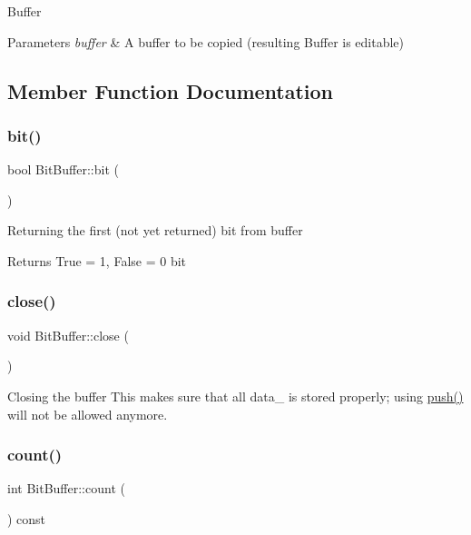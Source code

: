 Buffer 
\begin{DoxyParams}{Parameters}
{\em buffer} & A buffer to be copied (resulting Buffer is editable) \\
\hline
\end{DoxyParams}


\subsection{Member Function Documentation}
\mbox{\label{class_bit_buffer_a50d13861a778aff828e42e4f32371726}} 
\subsubsection{\texorpdfstring{bit()}{bit()}}
{\footnotesize\ttfamily bool Bit\+Buffer\+::bit (\begin{DoxyParamCaption}{ }\end{DoxyParamCaption})}

Returning the first (not yet returned) bit from buffer \begin{DoxyReturn}{Returns}
True = 1, False = 0 bit 
\end{DoxyReturn}
\mbox{\label{class_bit_buffer_a1075aee0daeee83dbe4908c325b6969f}} 
\subsubsection{\texorpdfstring{close()}{close()}}
{\footnotesize\ttfamily void Bit\+Buffer\+::close (\begin{DoxyParamCaption}{ }\end{DoxyParamCaption})}

Closing the buffer This makes sure that all data\+\_\+ is stored properly; using \hyperlink{class_bit_buffer_a1998d0bdd95e025f39e81671f5a20106}{push()} will not be allowed anymore. \mbox{\label{class_bit_buffer_a8c13b651d37586ec5c2d30f45ed89e53}} 
\subsubsection{\texorpdfstring{count()}{count()}}
{\footnotesize\ttfamily int Bit\+Buffer\+::count (\begin{DoxyParamCaption}{ }\end{DoxyParamCaption}) const\hspace{0.3cm}{\ttfamily [inline]}}

